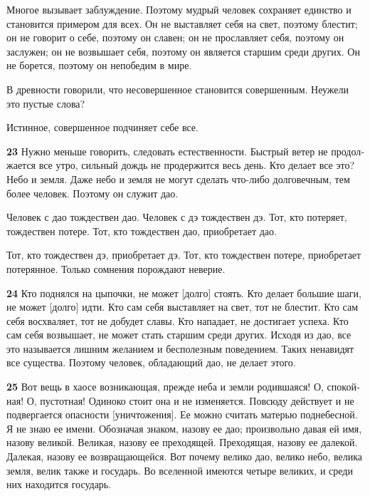 \documentclass[a4paper]{article}
\begin{document}
{
Многое вызывает заблуждение. Поэтому мудрый человек сохраняет единство и становится примером для всех. Он не выставляет
себя на свет, поэтому блестит; он не говорит о себе, поэтому он славен; он не прославляет себя, поэтому он заслужен; он
не возвышает себя, поэтому он является старшим среди других. Он не борется, поэтому он непобедим в мире.}

{
В древности говорили, что несовершенное становится совершенным. Неужели это пустые слова?}

{
Истинное, совершенное подчиняет себе все.}

{\ttfamily
\foreignlanguage{russian}{\textrm{\textbf{23}}}\foreignlanguage{russian}{\textrm{ Нужно меньше говорить, следовать
естественности. Быстрый ветер не продолжается все утро, сильный дождь не продержится весь день. Кто делает все это?
Небо и земля. Даже небо и земля не могут сделать что-либо долговечным, тем более человек. Поэтому он служит дао.}}}

{\ttfamily
\foreignlanguage{russian}{\textrm{Человек с дао тождествен дао. Человек с дэ тождествен дэ. Тот, кто потеряет,
тождествен потере. Тот, кто тождествен дао, приобретает дао.}}}

{\ttfamily
\foreignlanguage{russian}{\textrm{Тот, кто тождествен дэ, приобретает дэ. Тот, кто тождествен потере, приобретает
потерянное. Только сомнения порождают неверие.}}}

{\ttfamily
\foreignlanguage{russian}{\textrm{\textbf{24}}}\foreignlanguage{russian}{\textrm{ Кто поднялся на цыпочки, не может
[долго] стоять. Кто делает большие шаги, не может [долго] идти. Кто сам себя выставляет на свет, тот не блестит. Кто
сам себя восхваляет, тот не добудет славы. Кто нападает, не достигает успеха. Кто сам себя возвышает, не может стать
старшим среди других. Исходя из дао, все это называется лишним желанием и бесполезным поведением. Таких ненавидят все
существа. Поэтому человек, обладающий дао, не делает этого.}}}

{\ttfamily
\foreignlanguage{russian}{\textrm{\textbf{25}}}\foreignlanguage{russian}{\textrm{ Вот вещь в хаосе возникающая, прежде
неба и земли родившаяся! О, спокойная! О, пустотная! Одиноко стоит она и не изменяется. Повсюду действует и не
подвергается опасности [уничтожения]. Ее можно считать матерью поднебесной. Я не знаю ее имени. Обозначая знаком,
назову ее дао; произвольно давая ей имя, назову великой. Великая, назову ее преходящей. Преходящая, назову ее далекой.
Далекая, назову ее возвращающейся. Вот почему велико дао, велико небо, велика земля, велик также и государь. Во
вселенной имеются четыре великих, и среди них находится государь.}}}
\end{document}
